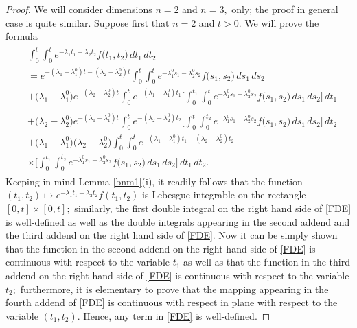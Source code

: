 \documentclass[10pt,a4paper]{amsart}
\begin{document}
\begin{proof}
We will consider dimensions $n=2$ and $n=3,$ only; the proof in general case is quite similar.
Suppose first that $n=2 $ and $t>0.$ We will prove the formula{\small
\begin{align}\label{FDE}
\begin{split}
& \int^{t}_{0}\int^{t}_{0}e^{-\lambda_{1}t_{1}-\lambda_{2}t_{2}}f\bigl( t_{1},t_{2}\bigr)\, dt_{1}\, dt_{2}
\\ & =e^{-(\lambda_{1}-\lambda_{1}^{0})t-(\lambda_{2}-\lambda_{2}^{0})t}\int^{t}_{0}\int^{t}_{0}e^{-\lambda_{1}^{0}s_{1}-\lambda_{2}^{0}s_{2}}f\bigl( s_{1},s_{2}\bigr)\, ds_{1}\, ds_{2} 
\\& +\bigl( \lambda_{1}-\lambda_{1}^{0}\bigr)e^{-(\lambda_{2}-\lambda_{2}^{0})t}\int^{t}_{0}e^{-(\lambda_{1}-\lambda_{1}^{0})t_{1}}\Biggl[ \int^{t_{1}}_{0}\int^{t}_{0}e^{-\lambda_{1}^{0}s_{1}-\lambda_{2}^{0}s_{2}}f\bigl( s_{1},s_{2}\bigr)\, ds_{1} \, ds_{2}\Biggr]\, dt_{1} \\
& \\& +\bigl( \lambda_{2}-\lambda_{2}^{0}\bigr)e^{-(\lambda_{1}-\lambda_{1}^{0})t}\int^{t}_{0}e^{-(\lambda_{2}-\lambda_{2}^{0})t_{2}}\Biggl[ \int^{t}_{0}\int^{t_{2}}_{0}e^{-\lambda_{1}^{0}s_{1}-\lambda_{2}^{0}s_{2}}f\bigl( s_{1},s_{2}\bigr)\, ds_{1} \, ds_{2}\Biggr]\, dt_{2}
\\& +\bigl( \lambda_{1}-\lambda_{1}^{0}\bigr)\bigl( \lambda_{2}-\lambda_{2}^{0}\bigr)\int^{t}_{0}\int^{t}_{0}e^{-(\lambda_{1}-\lambda_{1}^{0})t_{1}-(\lambda_{2}-\lambda_{2}^{0})t_{2}}
\\& \times \Biggl[ \int^{t_{1}}_{0}\int^{t_{2}}_{0}e^{-\lambda_{1}^{0}s_{1}-\lambda_{2}^{0}s_{2}}f\bigl( s_{1},s_{2}\bigr)\, ds_{1}\, ds_{2}  \Biggr]\, dt_{1}\, dt_{2}.
\end{split}
\end{align}}
Keeping in mind Lemma \ref{bnm1}(i), it readily follows that the function $(t_{1},t_{2})\mapsto e^{-\lambda_{1}t_{1}-\lambda_{2}t_{2}}f( t_{1},t_{2})$ is Lebesgue integrable on the rectangle $[0,t] \times [0,t];$ similarly, the first double integral on the right hand side of \eqref{FDE} is well-defined as well as the double integrals appearing in the second addend and the third addend on the right hand side of \eqref{FDE}. Now it can be simply shown that the function in the second addend on the right hand side of \eqref{FDE} is continuous with respect to the variable $t_{1}$ as well as that the function in the third addend on the right hand side of \eqref{FDE} is continuous with respect to the variable $t_{2};$ furthermore, it is elementary to prove that the mapping appearing in the fourth addend of \eqref{FDE} is continuous with respect in plane with respect to the variable $(t_{1},t_{2}).$ Hence, any term in \eqref{FDE} is well-defined. 


\end{proof}
\end{document}
